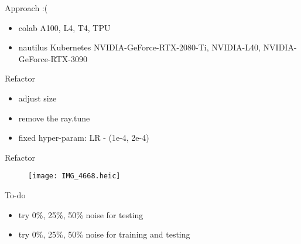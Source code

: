 \begin{frame}{Approach :(}
    \begin{itemize}
        \item colab 
              A100, L4, T4, TPU
        \item nautilus 
              Kubernetes 
              NVIDIA-GeForce-RTX-2080-Ti, NVIDIA-L40, NVIDIA-GeForce-RTX-3090
    \end{itemize}
\end{frame}

\begin{frame}{Refactor}
    \begin{itemize}
        \item
              adjust size
        \item
              remove the ray.tune
        \item
              fixed hyper-param: LR - (1e-4, 2e-4) 
    \end{itemize}
\end{frame}

\begin{frame}{Refactor}
    \begin{figure} 
        \centering
        \texttt{[image: IMG\_4668.heic]} 
    \end{figure}
\end{frame}

\begin{frame}{To-do}
    \begin{itemize}
        \item try 0\%, 25\%, 50\% noise for testing
        \item try 0\%, 25\%, 50\% noise for training and testing
    \end{itemize}
\end{frame}


